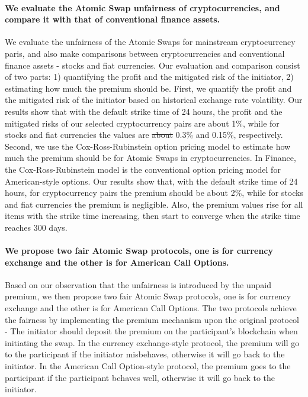 \paragraph{We evaluate the Atomic Swap unfairness of cryptocurrencies, and compare it with that of conventional finance assets.}
We evaluate the unfairness of the Atomic Swaps for mainstream cryptocurrency paris, and also make comparisons between cryptocurrencies and conventional finance assets - stocks and fiat currencies.
Our evaluation and comparison consist of two parts: 1) quantifying the profit and the mitigated risk of the initiator, 2) estimating how much the premium should be.
First, we quantify the profit and the mitigated risk of the initiator based on historical exchange rate volatility.
Our results show that with the default strike time of 24 hours, the profit and the mitigated risks of our selected cryptocurrency pairs are about 1\%, while for stocks and fiat currencies the values are \sout{about}  0.3\% and 0.15\%, respectively.
Second, we use the Cox-Ross-Rubinstein option pricing model to estimate how much the premium should be for Atomic Swaps in cryptocurrencies.
In Finance, the Cox-Ross-Rubinstein model is the conventional option pricing model for American-style options.
Our results show that, with the default strike time of 24 hours, for cryptocurrency pairs the premium should be about 2\%, while for stocks and fiat currencies the premium is negligible.
Also, the premium values rise for all items with the strike time increasing, then start to converge when the strike time reaches 300 days.

\paragraph{We propose two fair Atomic Swap protocols, one is for currency exchange and the other is for American Call Options.}
Based on our observation that the unfairness is introduced by the unpaid premium,
we then propose two fair Atomic Swap protocols, one is for currency exchange and the other is for American Call Options.
The two protocols achieve the fairness by implementing the premium mechanism upon the original protocol - The initiator should deposit the premium on the participant's blockchain when initiating the swap.
In the currency exchange-style protocol, the premium will go to the participant if the initiator misbehaves, otherwise it will go back to the initiator.
In the American Call Option-style protocol, the premium goes to the participant if the participant behaves well, otherwise it will go back to the initiator.

